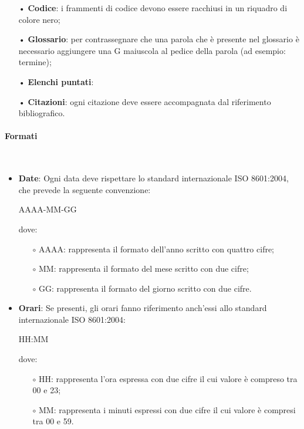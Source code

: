 \begin{itemize}
\item[•] \textbf{Codice}: i frammenti di codice devono essere racchiusi in un riquadro di colore nero;
\item[•] \textbf{Glossario}: per contrassegnare che una parola che è presente nel glossario è necessario aggiungere una G maiuscola al pedice della parola (ad esempio: {termine});
\item[•] \textbf{Elenchi puntati}:
\item[•] \textbf{Citazioni}: ogni citazione deve essere accompagnata dal riferimento bibliografico.
\end{itemize}

\paragraph{Formati}\mbox{}\\ \label{sec:Formati}
\begin{itemize}
\item \textbf{Date}: Ogni data deve rispettare lo standard internazionale ISO 8601:2004, che prevede la seguente convenzione:
\begin{center}
AAAA-MM-GG
\end{center}
dove: 
\begin{itemize}
\item[$\circ$] AAAA: rappresenta il formato dell'anno scritto con quattro cifre;
\item[$\circ$] MM: rappresenta il formato del mese scritto con due cifre;
\item[$\circ$] GG: rappresenta il formato del giorno scritto con due cifre.
\end{itemize}
\item \textbf{Orari}: Se presenti, gli orari fanno riferimento anch'essi allo standard internazionale ISO 8601:2004:
\begin{center}
HH:MM
\end{center}
dove:
\begin{itemize}
\item[$\circ$] HH: rappresenta l'ora espressa con due cifre il cui valore è compreso tra 00 e 23;
\item[$\circ$] MM: rappresenta i minuti espressi con due cifre il cui valore è compresi tra 00 e 59.
\end{itemize}
\end{itemize}


